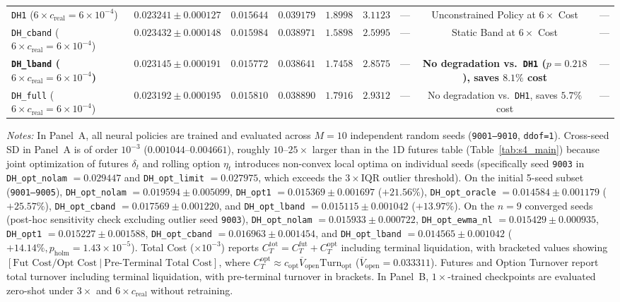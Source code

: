 \documentclass[11pt,a4paper]{article}
\begin{document}
\begin{table}[htbp]
{\begin{tabular}{lcccccccc}
    \texttt{DH1} ($6\times c_{\text{real}} = 6\times 10^{-4}$) & $0.023241 \pm 0.000127$ & $0.015644$ & $0.039179$ & $1.8998$ & $3.1123$ & --- & Unconstrained Policy at $6\times$ Cost & --- \\
    \texttt{DH\_cband} ($6\times c_{\text{real}} = 6\times 10^{-4}$) & $0.023432 \pm 0.000148$ & $0.015984$ & $0.038971$ & $1.5898$ & $2.5995$ & --- & Static Band at $6\times$ Cost & --- \\
    \textbf{\texttt{DH\_lband} ($6\times c_{\text{real}} = 6\times 10^{-4}$)} & $\mathbf{0.023145 \pm 0.000191}$ & $0.015772$ & $\mathbf{0.038641}$ & $\mathbf{1.7458}$ & $\mathbf{2.8575}$ & --- & \textbf{No degradation vs.\ \texttt{DH1} ($p=0.218$), saves $8.1\%$ cost} & --- \\
    \texttt{DH\_full} ($6\times c_{\text{real}} = 6\times 10^{-4}$) & $0.023192 \pm 0.000195$ & $0.015810$ & $0.038890$ & $1.7916$ & $2.9312$ & --- & No degradation vs.\ \texttt{DH1}, saves $5.7\%$ cost & --- \\
    \bottomrule
  \end{tabular}%
  }
  \vspace{3pt}\par\noindent
  \begin{minipage}{\textwidth}
    \footnotesize
    \textit{Notes:} In Panel~A, all neural policies are trained and evaluated across $M = 10$ independent random seeds (\texttt{9001--9010}, \texttt{ddof=1}). Cross-seed SD in Panel~A is of order $10^{-3}$ ($0.001044\text{--}0.004661$), roughly $10\text{--}25\times$ larger than in the 1D futures table (Table~\ref{tab:s4_main}) because joint optimization of futures $\delta_t$ and rolling option $\eta_t$ introduces non-convex local optima on individual seeds (specifically seed \texttt{9003} in \texttt{DH\_opt\_nolam} $= 0.029447$ and \texttt{DH\_opt\_limit} $= 0.027975$, which exceeds the $3\times\text{IQR}$ outlier threshold). On the initial 5-seed subset (\texttt{9001--9005}), \texttt{DH\_opt\_nolam} $= 0.019594 \pm 0.005099$, \texttt{DH\_opt1} $= 0.015369 \pm 0.001697$ ($+21.56\%$), \texttt{DH\_opt\_oracle} $= 0.014584 \pm 0.001179$ ($+25.57\%$), \texttt{DH\_opt\_cband} $= 0.017569 \pm 0.001220$, and \texttt{DH\_opt\_lband} $= 0.015115 \pm 0.001042$ ($+13.97\%$). On the $n = 9$ converged seeds (post-hoc sensitivity check excluding outlier seed \texttt{9003}), \texttt{DH\_opt\_nolam} $= 0.015933 \pm 0.000722$, \texttt{DH\_opt\_ewma\_nl} $= 0.015429 \pm 0.000935$, \texttt{DH\_opt1} $= 0.015227 \pm 0.001588$, \texttt{DH\_opt\_cband} $= 0.016963 \pm 0.001454$, and \texttt{DH\_opt\_lband} $= 0.014565 \pm 0.001042$ ($+14.14\%, p_{\text{holm}} = 1.43 \times 10^{-5}$). Total Cost ($\times 10^{-3}$) reports $C_T^{\text{tot}} = C_T^{\text{fut}} + C_T^{\text{opt}}$ including terminal liquidation, with bracketed values showing $[\text{Fut Cost} / \text{Opt Cost}\ |\ \text{Pre-Terminal Total Cost}]$, where $C_T^{\text{opt}} \approx c_{\text{opt}}\overline{V}_{\text{open}}\text{Turn}_{\text{opt}}$ ($\overline{V}_{\text{open}} = 0.033311$). Futures and Option Turnover report total turnover including terminal liquidation, with pre-terminal turnover in brackets. In Panel~B, $1\times$-trained checkpoints are evaluated zero-shot under $3\times$ and $6\times c_{\text{real}}$ without retraining.

\end{minipage}
\end{table}
\end{document}
